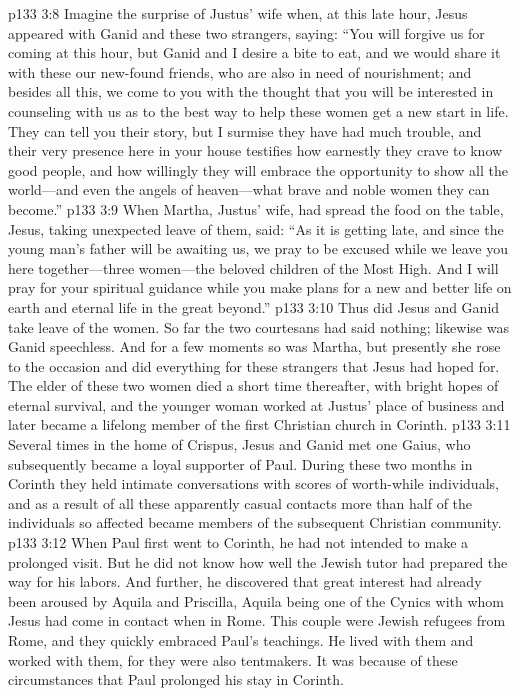 \vs p133 3:8 Imagine the surprise of Justus’ wife when, at this late hour, Jesus appeared with Ganid and these two strangers, saying: \textcolor{ubdarkred}{“You will forgive us for coming at this hour, but Ganid and I desire a bite to eat, and we would share it with these our new\hyp{}found friends, who are also in need of nourishment; and besides all this, we come to you with the thought that you will be interested in counseling with us as to the best way to help these women get a new start in life. They can tell you their story, but I surmise they have had much trouble, and their very presence here in your house testifies how earnestly they crave to know good people, and how willingly they will embrace the opportunity to show all the world---and even the angels of heaven---what brave and noble women they can become.”}
\vs p133 3:9 When Martha, Justus’ wife, had spread the food on the table, Jesus, taking unexpected leave of them, said: \textcolor{ubdarkred}{“As it is getting late, and since the young man’s father will be awaiting us, we pray to be excused while we leave you here together---three women---the beloved children of the Most High. And I will pray for your spiritual guidance while you make plans for a new and better life on earth and eternal life in the great beyond.”}
\vs p133 3:10 Thus did Jesus and Ganid take leave of the women. So far the two courtesans had said nothing; likewise was Ganid speechless. And for a few moments so was Martha, but presently she rose to the occasion and did everything for these strangers that Jesus had hoped for. The elder of these two women died a short time thereafter, with bright hopes of eternal survival, and the younger woman worked at Justus’ place of business and later became a lifelong member of the first Christian church in Corinth.\plusone
\vs p133 3:11 Several times in the home of Crispus, Jesus and Ganid met one Gaius, who subsequently became a loyal supporter of Paul. During these two months in Corinth they held intimate conversations with scores of worth\hyp{}while individuals, and as a result of all these apparently casual contacts more than half of the individuals so affected became members of the subsequent Christian community.
\vs p133 3:12 When Paul first went to Corinth, he had not intended to make a prolonged visit. But he did not know how well the Jewish tutor had prepared the way for his labors. And further, he discovered that great interest had already been aroused by Aquila and Priscilla, Aquila being one of the Cynics with whom Jesus had come in contact when in Rome. This couple were Jewish refugees from Rome, and they quickly embraced Paul’s teachings. He lived with them and worked with them, for they were also tentmakers. It was because of these circumstances that Paul prolonged his stay in Corinth.
